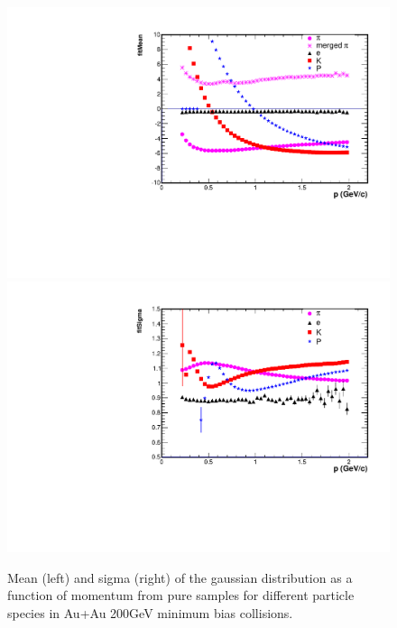 \begin{figure}
\begin{centering}
\includegraphics[angle=270,scale=0.35]{fig/3.Analysis/Additional/purity/mean3}\includegraphics[angle=270,scale=0.35]{fig/3.Analysis/Additional/purity/sigma3}
\par\end{centering}

\protect\caption{Mean (left) and sigma (right) of the gaussian distribution as a function
of momentum from pure samples for different particle species in Au+Au
200GeV minimum bias collisions.}


\end{figure}


